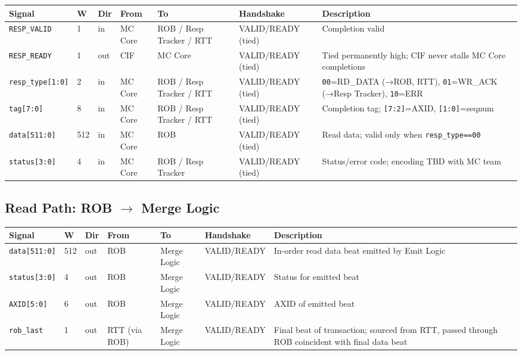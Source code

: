 \documentclass[11pt,a4paper]{article}
\begin{document}
\begin{tabularx}{\textwidth}{L{3.0cm} C{0.8cm} C{1.0cm} L{2.2cm} L{2.2cm} L{2.0cm} X}
\toprule
\textbf{Signal} & \textbf{W} & \textbf{Dir} & \textbf{From} & \textbf{To} & \textbf{Handshake} & \textbf{Description} \\
\midrule
\texttt{RESP\_VALID}     & 1   & in  & MC Core & ROB / Resp Tracker / RTT & VALID/READY (tied) & Completion valid \\
\texttt{RESP\_READY}     & 1   & out & CIF     & MC Core & VALID/READY (tied) & Tied permanently high; CIF never stalls MC Core completions \\
\texttt{resp\_type[1:0]} & 2   & in  & MC Core & ROB / Resp Tracker / RTT & VALID/READY (tied) & \texttt{00}=RD\_DATA (→ROB, RTT), \texttt{01}=WR\_ACK (→Resp Tracker), \texttt{10}=ERR \\
\texttt{tag[7:0]}        & 8   & in  & MC Core & ROB / Resp Tracker / RTT & VALID/READY (tied) & Completion tag; \texttt{[7:2]}=AXID, \texttt{[1:0]}=seqnum \\
\texttt{data[511:0]}     & 512 & in  & MC Core & ROB & VALID/READY (tied) & Read data; valid only when \texttt{resp\_type==00} \\
\texttt{status[3:0]}     & 4   & in  & MC Core & ROB / Resp Tracker & VALID/READY (tied) & Status/error code; encoding TBD with MC team \\
\bottomrule
\end{tabularx}

\subsection{Read Path: ROB $\rightarrow$ Merge Logic}

\begin{tabularx}{\textwidth}{L{3.0cm} C{0.8cm} C{1.0cm} L{2.2cm} L{2.2cm} L{2.0cm} X}
\toprule
\textbf{Signal} & \textbf{W} & \textbf{Dir} & \textbf{From} & \textbf{To} & \textbf{Handshake} & \textbf{Description} \\
\midrule
\texttt{data[511:0]}   & 512 & out & ROB & Merge Logic & VALID/READY & In-order read data beat emitted by Emit Logic \\
\texttt{status[3:0]}   & 4   & out & ROB & Merge Logic & VALID/READY & Status for emitted beat \\
\texttt{AXID[5:0]}     & 6   & out & ROB & Merge Logic & VALID/READY & AXID of emitted beat \\
\texttt{rob\_last}     & 1   & out & RTT (via ROB) & Merge Logic & VALID/READY & Final beat of transaction; sourced from RTT, passed through ROB coincident with final data beat \\
\bottomrule
\end{tabularx}
\end{document}
